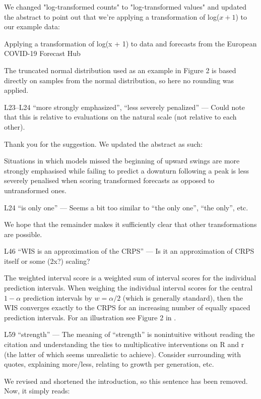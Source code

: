 \documentclass{article}
\newcommand{\black}{\color{black}}
\newcommand{\blue}{\color{blue}}
\newcommand{\indented}{\setlength{\leftskip}{1cm}}
\newcommand{\notindented}{\setlength{\leftskip}{0cm}}
\begin{document}
\black
We changed "log-transformed counts" to "log-transformed values" and updated the abstract to point out that we're applying a transformation of log($x + 1$) to our example data: 

\indented
Applying a transformation of log(x + 1) to data and forecasts from the European COVID-19 Forecast Hub

\notindented

The truncated normal distribution used as an example in Figure 2 is based directly on samples from the normal distribution, so here no rounding was applied. 

\blue
L23–L24 “more strongly emphasized”, “less severely penalized” — Could note that this is relative to evaluations on the natural scale (not relative to each other).

\black
Thank you for the suggestion. We updated the abstract as such: 

\indented
Situations in which models missed the beginning of upward swings are more strongly emphasised while failing to predict a downturn following a peak is less severely penalised when scoring transformed forecasts as opposed to untransformed ones.

\notindented

\blue
L24 “is only one” — Seems a bit too similar to “the only one”, “the only”, etc.

\black
We hope that the remainder makes it sufficiently clear that other transformations are possible. 

\blue
L46 “WIS is an approximation of the CRPS” — Is it an approximation of CRPS itself or some (2x?) scaling?

\black
The weighted interval score is a weighted sum of interval scores for the individual prediction intervals. When weighing the individual interval scores for the central $1 - \alpha$ prediction intervals by 
$w = \alpha / 2$ (which is generally standard), then the WIS converges exactly to the CRPS for an increasing number of equally spaced prediction intervals. For an illustration see Figure 2 in \cite{bracherEvaluatingEpidemicForecasts2021}.

\blue
L59 “strength” — The meaning of “strength” is nonintuitive without reading the citation and understanding the ties to multiplicative interventions on R and r (the latter of which seems unrealistic to achieve). Consider surrounding with quotes, explaining more/less, relating to growth per generation, etc.

\black
We revised and shortened the introduction, so this sentence has been removed. Now, it simply reads: 
\end{document}
